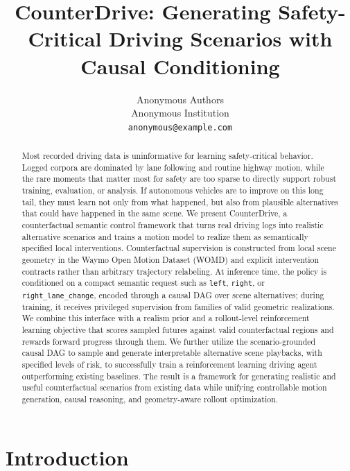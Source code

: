 \documentclass{article}
\title{CounterDrive: Generating Safety-Critical Driving Scenarios with Causal Conditioning}
\author{%
  Anonymous Authors \\
  Anonymous Institution \\
  \texttt{anonymous@example.com}
}
\newcommand{\zhou}[1]{{\textsf{\textcolor{red}{[Zhou: #1]}}}}
\begin{document}
\maketitle

\begin{abstract}
Most recorded driving data is uninformative for learning safety-critical behavior. Logged corpora are dominated by lane following and routine highway motion, while the rare moments that matter most for safety are too sparse to directly support robust training, evaluation, or analysis. If autonomous vehicles are to improve on this long tail, they must learn not only from what happened, but also from plausible alternatives that could have happened in the same scene. We present CounterDrive, a counterfactual semantic control framework that turns real driving logs into realistic alternative scenarios and trains a motion model to realize them as semantically specified local interventions. Counterfactual supervision is constructed from local scene geometry in the Waymo Open Motion Dataset (WOMD) and explicit intervention contracts rather than arbitrary trajectory relabeling. At inference time, the policy is conditioned on a compact semantic request such as \texttt{left}, \texttt{right}, or \texttt{right\_lane\_change}, encoded through a causal DAG over scene alternatives; during training, it receives privileged supervision from families of valid geometric realizations. We combine this interface with a realism prior and a rollout-level reinforcement learning objective that scores sampled futures against valid counterfactual regions and rewards forward progress through them. We further utilize the scenario-grounded causal DAG to sample and generate interpretable alternative scene playbacks, with specified levels of risk, to successfully train a reinforcement learning driving agent outperforming existing baselines. The result is a framework for generating realistic and useful counterfactual scenarios from existing data while unifying controllable motion generation, causal reasoning, and geometry-aware rollout optimization.
\end{abstract}

\section{Introduction}
\label{sec:introduction}
\end{document}
